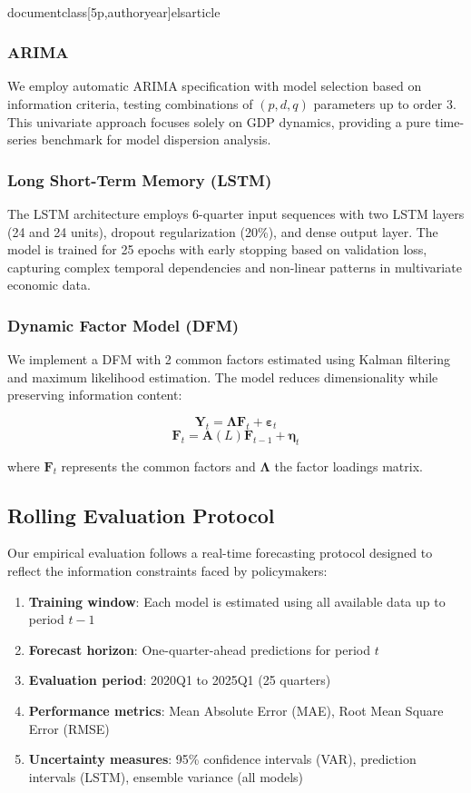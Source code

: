 \\documentclass[5p,authoryear]{elsarticle}
\begin{document}
{\subsubsection{ARIMA}
We employ automatic ARIMA specification with model selection based on information criteria, testing combinations of $(p,d,q)$ parameters up to order 3. This univariate approach focuses solely on GDP dynamics, providing a pure time-series benchmark for model dispersion analysis.

\subsubsection{Long Short-Term Memory (LSTM)}
The LSTM architecture employs 6-quarter input sequences with two LSTM layers (24 and 24 units), dropout regularization (20\%), and dense output layer. The model is trained for 25 epochs with early stopping based on validation loss, capturing complex temporal dependencies and non-linear patterns in multivariate economic data.

\subsubsection{Dynamic Factor Model (DFM)}
We implement a DFM with 2 common factors estimated using Kalman filtering and maximum likelihood estimation. The model reduces dimensionality while preserving information content:

$$\mathbf{Y}_t = \boldsymbol{\Lambda} \mathbf{F}_t + \boldsymbol{\varepsilon}_t$$
$$\mathbf{F}_t = \mathbf{A}(L) \mathbf{F}_{t-1} + \boldsymbol{\eta}_t$$

where $\mathbf{F}_t$ represents the common factors and $\boldsymbol{\Lambda}$ the factor loadings matrix.

\subsection{Rolling Evaluation Protocol}

Our empirical evaluation follows a real-time forecasting protocol designed to reflect the information constraints faced by policymakers:

\begin{enumerate}
    \item \textbf{Training window}: Each model is estimated using all available data up to period $t-1$
    \item \textbf{Forecast horizon}: One-quarter-ahead predictions for period $t$
    \item \textbf{Evaluation period}: 2020Q1 to 2025Q1 (25 quarters)
    \item \textbf{Performance metrics}: Mean Absolute Error (MAE), Root Mean Square Error (RMSE)
    \item \textbf{Uncertainty measures}: 95\% confidence intervals (VAR), prediction intervals (LSTM), ensemble variance (all models)
\end{enumerate}

}
\end{document}
